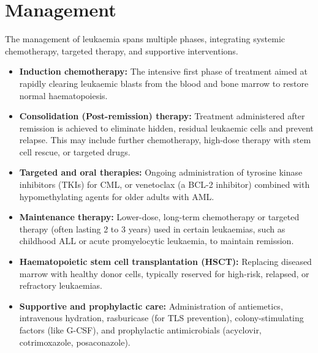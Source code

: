 \section*{Management}
The management of leukaemia spans multiple phases, integrating systemic chemotherapy, targeted therapy, and supportive interventions.
\begin{itemize}
    \item \textbf{Induction chemotherapy:} The intensive first phase of treatment aimed at rapidly clearing leukaemic blasts from the blood and bone marrow to restore normal haematopoiesis.
    \item \textbf{Consolidation (Post-remission) therapy:} Treatment administered after remission is achieved to eliminate hidden, residual leukaemic cells and prevent relapse. This may include further chemotherapy, high-dose therapy with stem cell rescue, or targeted drugs.
    \item \textbf{Targeted and oral therapies:} Ongoing administration of tyrosine kinase inhibitors (TKIs) for CML, or venetoclax (a BCL-2 inhibitor) combined with hypomethylating agents for older adults with AML.
    \item \textbf{Maintenance therapy:} Lower-dose, long-term chemotherapy or targeted therapy (often lasting 2 to 3 years) used in certain leukaemias, such as childhood ALL or acute promyelocytic leukaemia, to maintain remission.
    \item \textbf{Haematopoietic stem cell transplantation (HSCT):} Replacing diseased marrow with healthy donor cells, typically reserved for high-risk, relapsed, or refractory leukaemias.
    \item \textbf{Supportive and prophylactic care:} Administration of antiemetics, intravenous hydration, rasburicase (for TLS prevention), colony-stimulating factors (like G-CSF), and prophylactic antimicrobials (acyclovir, cotrimoxazole, posaconazole).
\end{itemize}

